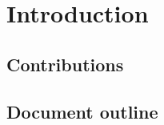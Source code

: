 
\chapter{Introduction}\label{introduzione} %






\section{Contributions}
\section{Document outline}
 

